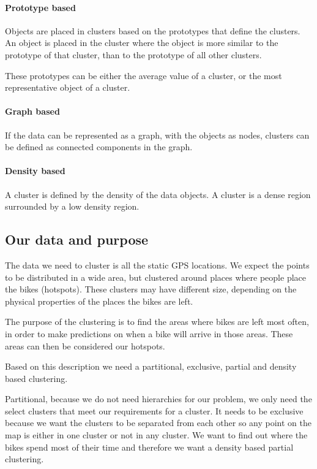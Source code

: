 \paragraph{Prototype based}
Objects are placed in clusters based on the prototypes that define the clusters.
An object is placed in the cluster where the object is more similar to the prototype of that cluster, than to the prototype of all other clusters.

These prototypes can be either the average value of a cluster, or the most representative object of a cluster.

\paragraph{Graph based}
If the data can be represented as a graph, with the objects as nodes, clusters can be defined as connected components in the graph.

\paragraph{Density based}
A cluster is defined by the density of the data objects.
A cluster is a dense region surrounded by a low density region.

\subsection{Our data and purpose}\label{data_purporse}
The data we need to cluster is all the static GPS locations.
We expect the points to be distributed in a wide area, but clustered around places where people place the bikes (hotspots).
These clusters may have different size, depending on the physical properties of the places the bikes are left.

The purpose of the clustering is to find the areas where bikes are left most often, in order to make predictions on when a bike will arrive in those areas.
These areas can then be considered our hotspots.

Based on this description we need a partitional, exclusive, partial and density based clustering.

Partitional, because we do not need hierarchies for our problem, we only need the select clusters that meet our requirements for a cluster.
It needs to be exclusive because we want the clusters to be separated from each other so any point on the map is either in one cluster or not in any cluster.
We want to find out where the bikes spend most of their time and therefore we want a density based partial clustering.

